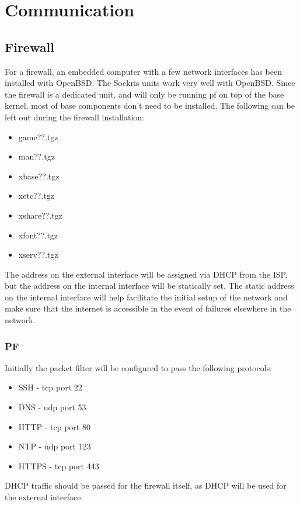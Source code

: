 \chapter{Communication}

\section{Firewall}
For a firewall, an embedded computer with a few network interfaces has been
installed with OpenBSD.  The Soekris units work very well with OpenBSD.  Since
the firewall is a dedicated unit, and will only be running pf on top of the base
kernel, most of base components don't need to be installed.  The following can
be left out during the firewall installation:
\begin{itemize}
\item
game??.tgz
\item
man??.tgz
\item
xbase??.tgz
\item
xetc??.tgz
\item
xshare??.tgz
\item
xfont??.tgz
\item
xserv??.tgz
\end{itemize}
The address on the external interface will be assigned via DHCP from the ISP,
but the address on the internal interface will be statically set.  The static
address on the internal interface will help facilitate the initial setup of the
network and make sure that the internet is accessible in the event of failures
elsewhere in the network.

\subsection{PF}
Initially the packet filter will be configured to pass the following protocols:
\begin{itemize}
\item
SSH - tcp port 22
\item
DNS - udp port 53
\item
HTTP - tcp port 80
\item
NTP - udp port 123
\item
HTTPS - tcp port 443
\end{itemize}
DHCP traffic should be passed for the firewall itself, as DHCP will be used for
the external interface.

